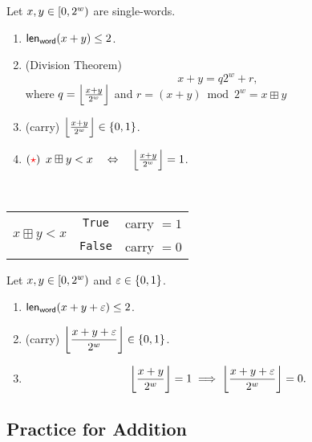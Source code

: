 \begin{tcolorbox}[colframe=procolor,title={\color{white}\bf Single-Word Addition \(x[i]+y[i]\)}]
\begin{proposition}
Let \(x,y\in\intco{0,2^w}\) are single-words. \begin{enumerate}[(1)]
	\item \(\len_\word(x+y)\leq 2\).
	\item (Division Theorem) $$ x+y=q2^w+r,$$ where $q=\floor*{\frac{x+y}{2^w}}$ and $r=(x+y)\bmod 2^w=x\boxplus y$
	\item (carry) \(\floor*{\frac{x+y}{2^w}}\in\set{0,1}\).
	\item $(\textcolor{red}{\star})$ $x\boxplus y < x\quad\Leftrightarrow\quad\floor*{\frac{x+y}{2^w}}=1$.
\end{enumerate}
\end{proposition}
\end{tcolorbox}
\begin{note}
\ \begin{table}[h!]\centering\renewcommand{\arraystretch}{1.25}
\begin{tabular}{c|c|c}\hline
	\multirow{2}{*}{$x\boxplus y < x$} & \texttt{True} & carry $=1$\\ \cline{2-3}
	& \texttt{False} & carry $=0$\\ \hline
\end{tabular}
\end{table}
\end{note}


\begin{tcolorbox}[colframe=procolor,title={\color{white}\bf Single-Word Addition with Carry \(x[i]+y[i]+\varepsilon\)}]
\begin{proposition}
Let \(x,y\in\intco{0,2^w}\) and \(\varepsilon\in\set{0,1}\). \begin{enumerate}[(1)]
	\item \(\len_\word(x+y+\varepsilon)\leq 2\).
	\item (carry) \(\displaystyle\floor*{\frac{x+y+\varepsilon}{2^w}}\in\set{0,1}\).
	\item \[
	\floor*{\frac{x+y}{2^w}}=1
		\implies\floor*{\frac{x+y+\varepsilon}{2^w}}=0.
	\]
\end{enumerate}
\end{proposition}
\end{tcolorbox}

\subsection{Practice for Addition}

